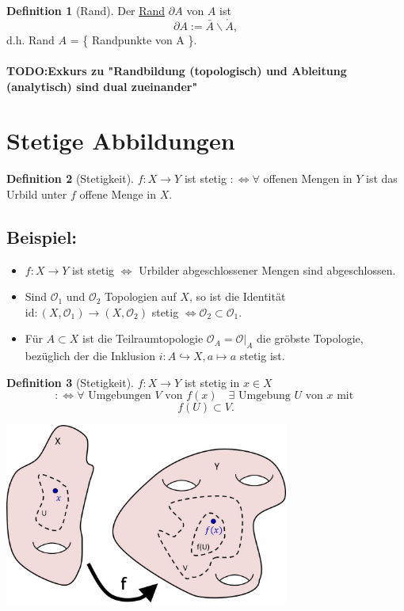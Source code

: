 \documentclass[a4paper,11pt,notitlepage]{report}
\theoremstyle{remark}
\theoremstyle{definition}
\newtheorem{definition}{Definition}[chapter]
\newcommand{\OO}{{\ensuremath{\mathcal{O}}}}
\newenvironment{bsp}[1]
{
\setlength{\fboxsep}{10pt}
\subsection*{Beispiel: #1}
\begin{upshape}
}
{
\end{upshape}
}
\begin{document}
\begin{definition}[Rand]
	Der \underline{Rand} $\partial A$ von $A$ ist $$\partial A := \bar{A} \backslash \mathring A,$$ d.h. Rand $A$ = \{ Randpunkte von A \}.
\end{definition}

\paragraph{TODO:Exkurs zu "Randbildung (topologisch) und Ableitung (analytisch) sind dual zueinander"}

\section{Stetige Abbildungen}

\begin{definition}[Stetigkeit]
	$f \colon X \rightarrow Y$ ist stetig $:\Leftrightarrow \forall$ offenen Mengen in $Y$ ist das Urbild unter $f$ offene Menge in $X$.
\end{definition}

\begin{bsp}{}
	\begin{itemize}
		\item $f \colon X \rightarrow Y$ ist stetig $\Leftrightarrow$ Urbilder abgeschlossener Mengen sind abgeschlossen.
		\item Sind $\OO_1$ und $\OO_2$ Topologien auf $X$, so ist die Identität $\text{id} \colon (X,\OO_1) \rightarrow (X,\OO_2)$ stetig $\Leftrightarrow \OO_2 \subset \OO_1$.
		\item Für $A \subset X$ ist die Teilraumtopologie $\OO_A = \OO \big |_A$ die gröbste Topologie, bezüglich der die Inklusion $i \colon A \hookrightarrow X, a \mapsto a$ stetig ist.
	\end{itemize}
\end{bsp}

\begin{definition}[Stetigkeit] %
	$f \colon X \rightarrow Y$ ist stetig in $x \in X$
	$$:\Leftrightarrow \forall \text{ Umgebungen } V \text{ von } f(x) \quad \exists \text{ Umgebung } U \text{ von } x \text{ mit }$$ $$f(U) \subset V.$$
	\newline
\end{definition}
\begin{center}
\includegraphics[width=0.7\textwidth]{images/stetig_in_x.jpg}
\end{center}
\end{document}
